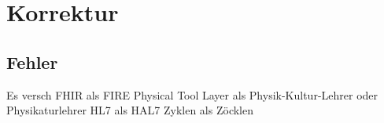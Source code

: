 












\section{Korrektur}
\subsection{Fehler}
Es versch 
FHIR als FIRE
Physical Tool Layer als Physik-Kultur-Lehrer oder Physikaturlehrer
HL7 als HAL7
Zyklen als Zöcklen
